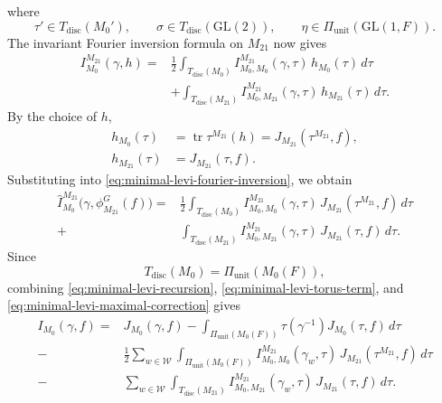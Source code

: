 \documentclass[11pt]{amsart}
\theoremstyle{definition}
\numberwithin{equation}{section}
\begin{document}
where
\[
\tau'\in T_{\mathrm{disc}}(M_0'),
\qquad
\sigma\in T_{\mathrm{disc}}(\mathrm{GL}(2)),
\qquad
\eta\in\Pi_{\mathrm{unit}}(\mathrm{GL}(1,F)).
\]
The invariant Fourier inversion formula on \(M_{21}\) now gives
\begin{equation}\label{eq:minimal-levi-fourier-inversion}
\begin{aligned}
I_{M_0}^{M_{21}}(\gamma,h)
=&
\frac12
\int_{T_{\mathrm{disc}}(M_0)}
I_{M_0,M_0}^{M_{21}}(\gamma,\tau)\,
h_{M_0}(\tau)\,d\tau\\
&+
\int_{T_{\mathrm{disc}}(M_{21})}
I_{M_0,M_{21}}^{M_{21}}(\gamma,\tau)\,
h_{M_{21}}(\tau)\,d\tau.
\end{aligned}
\end{equation}
By the choice of \(h\),
\[
\begin{aligned}
h_{M_0}(\tau)
&=
\operatorname{tr}\tau^{M_{21}}(h)
=
J_{M_{21}}(\tau^{M_{21}},f),\\
h_{M_{21}}(\tau)
&=
J_{M_{21}}(\tau,f).
\end{aligned}
\]
Substituting into
\eqref{eq:minimal-levi-fourier-inversion}, we obtain
\begin{equation}\label{eq:minimal-levi-maximal-correction}
\begin{aligned}
\widehat I_{M_0}^{M_{21}}
\bigl(\gamma,\phi_{M_{21}}^G(f)\bigr)
=&
\frac12
\int_{T_{\mathrm{disc}}(M_0)}
I_{M_0,M_0}^{M_{21}}(\gamma,\tau)\,
J_{M_{21}}(\tau^{M_{21}},f)\,d\tau\\
+&
\int_{T_{\mathrm{disc}}(M_{21})}
I_{M_0,M_{21}}^{M_{21}}(\gamma,\tau)\,
J_{M_{21}}(\tau,f)\,d\tau.
\end{aligned}
\end{equation}
Since
\[
T_{\mathrm{disc}}(M_0)
=
\Pi_{\mathrm{unit}}(M_0(F)),
\]
combining
\eqref{eq:minimal-levi-recursion},
\eqref{eq:minimal-levi-torus-term}, and
\eqref{eq:minimal-levi-maximal-correction}
gives
\begin{equation}\label{eq:minimal-levi-invariant}
\begin{aligned}
I_{M_0}(\gamma,f)
=&
J_{M_0}(\gamma,f)-
\int_{\Pi_{\mathrm{unit}}(M_0(F))}
\tau(\gamma^{-1})J_{M_0}(\tau,f)\,d\tau\\
-&
\frac12\sum_{w\in\mathscr W}
\int_{\Pi_{\mathrm{unit}}(M_0(F))}
I_{M_0,M_0}^{M_{21}}(\gamma_w,\tau)\,
J_{M_{21}}(\tau^{M_{21}},f)\,d\tau\\
-&
\sum_{w\in\mathscr W}
\int_{T_{\mathrm{disc}}(M_{21})}
I_{M_0,M_{21}}^{M_{21}}(\gamma_w,\tau)\,
J_{M_{21}}(\tau,f)\,d\tau.
\end{aligned}
\end{equation}
\end{document}
